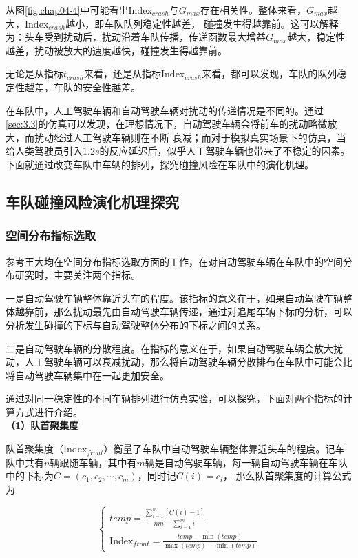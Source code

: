 从图\ref{fig:chap04-4}中可能看出$\mathrm{Index}_{crash}$与$G_{max}$存在相关性。整体来看，$G_{max}$越大，$\mathrm{Index}_{crash}$越小，即车队队列稳定性越差，
碰撞发生得越靠前。这可以解释为：头车受到扰动后，扰动沿着车队传播，传递函数最大增益$G_{max}$越大，稳定性越差，扰动被放大的速度越快，碰撞发生得越靠前。

无论是从指标$t_{crash}$来看，还是从指标$\mathrm{Index}_{crash}$来看，都可以发现，车队的队列稳定性越差，车队的安全性越差。

在车队中，人工驾驶车辆和自动驾驶车辆对扰动的传递情况是不同的。通过\ref{sec:3.3}的仿真可以发现，在理想情况下，自动驾驶车辆会将前车的扰动略微放大，而扰动经过人工驾驶车辆则在不断
衰减；而对于模拟真实场景下的仿真，当给人类驾驶员引入$1.2s$的反应延迟后，似乎人工驾驶车辆也带来了不稳定的因素。下面就通过改变车队中车辆的排列，探究碰撞风险在车队中的演化机理。

\subsection{车队碰撞风险演化机理探究}

\subsubsection{空间分布指标选取}

参考王大均在空间分布指标选取方面的工作\cite{wang2021auto}，在对自动驾驶车辆在车队中的空间分布研究时，主要关注两个指标。

一是自动驾驶车辆整体靠近头车的程度。该指标的意义在于，如果自动驾驶车辆整体越靠前，那么扰动最先由自动驾驶车辆传递，通过对追尾车辆下标的分析，可以分析发生碰撞的下标与自动驾驶整体分布的下标之间的关系。

二是自动驾驶车辆的分散程度。在指标的意义在于，如果自动驾驶车辆会放大扰动，人工驾驶车辆可以衰减扰动，那么将自动驾驶车辆分散排布在车队中可能会比将自动驾驶车辆集中在一起更加安全。

通过对同一稳定性的不同车辆排列进行仿真实验，可以探究，下面对两个指标的计算方式进行介绍。 \\

\noindent \textbf{（1）队首聚集度}

队首聚集度（$\mathrm{Index}_{front}$）衡量了车队中自动驾驶车辆整体靠近头车的程度。记车队中共有$n$辆跟随车辆，其中有$m$辆是自动驾驶车辆，每一辆自动驾驶车辆在车队中的下标为$C = (c_1, c_2, \cdots, c_m)$，同时记$C(i) = c_i$，
那么队首聚集度的计算公式为

\begin{equation}
    \begin{cases}
      temp = \frac{\sum_{i=1}^{m}[C(i) - 1 ]}{nm - \sum_{i=1}^{m}i} \\
      \mathrm{Index}_{front} = \frac{temp - \min(temp)}{\max(temp) - \min(temp)}
    \end{cases}
    \label{eq:chap04-2}
\end{equation}

